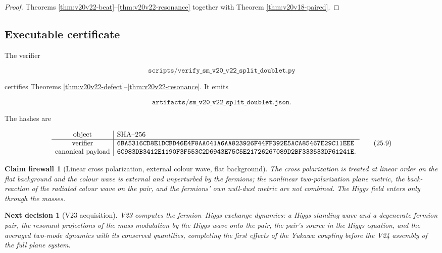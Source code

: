 \documentclass[11pt]{article}
\newtheorem{firewall}[theorem]{Claim firewall}
\newtheorem{decision}[theorem]{Next decision}
\theoremstyle{remark}
\begin{document}
\begin{proof}
Theorems \ref{thm:v20v22-beat}--\ref{thm:v20v22-resonance} together
with Theorem \ref{thm:v20v18-paired}.
\end{proof}

\subsection{Executable certificate}

The verifier

\[
 \texttt{scripts/verify\_sm\_v20\_v22\_split\_doublet.py}             \tag{25.7}
\]

certifies Theorems \ref{thm:v20v22-defect}--\ref{thm:v20v22-resonance}.
It emits

\[
 \texttt{artifacts/sm\_v20\_v22\_split\_doublet.json}.                \tag{25.8}
\]

The hashes are

\[
\begin{array}{c|l}
\hbox{object}&\hbox{SHA--256}\\ \hline
\hbox{verifier}&
\texttt{6BA5316CD8E1DCBD46E4F8AA041A6AA823926F44FF392E5ACA85467E29C11EEE}\\
\hbox{canonical payload}&
\texttt{6C983DB3412E1190F3F553C2D6943E75C5E21726267089D2BF333533DF61241E}.
\end{array}                                                     \tag{25.9}
\]

\begin{firewall}[Linear cross polarization, external colour wave, flat background]
\label{fire:v20v22}
The cross polarization is treated at linear order on the flat
background and the colour wave is external and unperturbed by the
fermions; the nonlinear two-polarization plane metric, the
back-reaction of the radiated colour wave on the pair, and the
fermions' own null-dust metric are not combined.  The Higgs field
enters only through the masses.
\end{firewall}

\begin{decision}[V23 acquisition]
\label{dec:v20v22-next}
V23 computes the fermion--Higgs exchange dynamics: a Higgs standing
wave and a degenerate fermion pair, the resonant projections of the
mass modulation by the Higgs wave onto the pair, the pair's source
in the Higgs equation, and the averaged two-mode dynamics with its
conserved quantities, completing the first effects of the Yukawa
coupling before the V24 assembly of the full plane system.
\end{decision}
\end{document}
